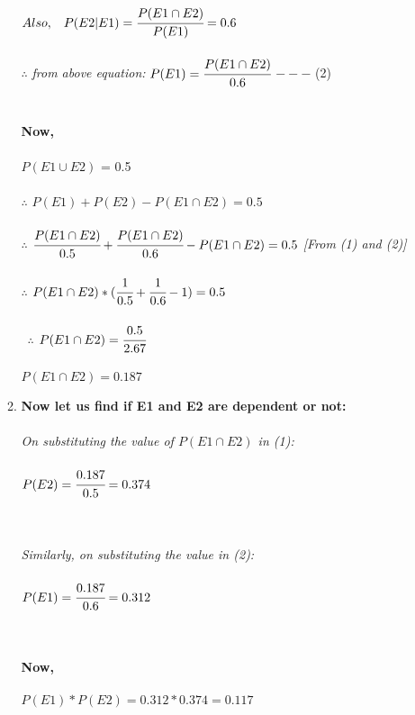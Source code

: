 \documentclass{article}
\begin{document}
\begin{enumerate}
\begin{enumerate}
    $Also, \hspace{3mm}P(E2|E1) = \cfrac{P(E1 \cap E2)}{P(E1)} = 0.6$\\\\
    $\therefore$ \textit{from above equation: } $P(E1) = \cfrac{P(E1 \cap E2)} {0.6}$ \hspace{5mm} \textit{}{$---$ (2)}\\\\\\

    \textbf{Now,}\\\\
    $P(E1 \cup E2)$ = 0.5\\\\
    $\therefore$ $P(E1) + P(E2) - P(E1 \cap E2) = 0.5$\\\\
    $\therefore$ $\cfrac{P(E1 \cap E2)}{0.5} + \cfrac{P(E1 \cap E2)}{0.6} - P(E1 \cap E2) = 0.5$\hspace{5mm} \textit{[From (1) and (2)]}\\\\
    $\therefore$ $P(E1 \cap E2)*(\cfrac{1}{0.5} + \cfrac{1}{0.6} - 1) = 0.5$\\\\\
    $\therefore$ $P(E1 \cap E2) = \cfrac{0.5}{2.67}$\\\\
    \boldmath $P(E1 \cap E2) = 0.187$


    \newpage \item
    \textbf{Now let us find if E1 and E2 are dependent or not: }\\\\

    \textit{On substituting the value of $P(E1 \cap E2)$ in (1): }\\\\
    $P(E2) = \cfrac{0.187}{0.5} = 0.374$\\\\\

    \textit{Similarly, on substituting the value in (2): }\\\\
    $P(E1) = \cfrac{0.187}{0.6} = 0.312$\\\\\

    \textbf{Now,}\\\\
    $P(E1)*P(E2) = 0.312 * 0.374 = 0.117$\\\\


\end{enumerate}
\end{enumerate}
\end{document}
